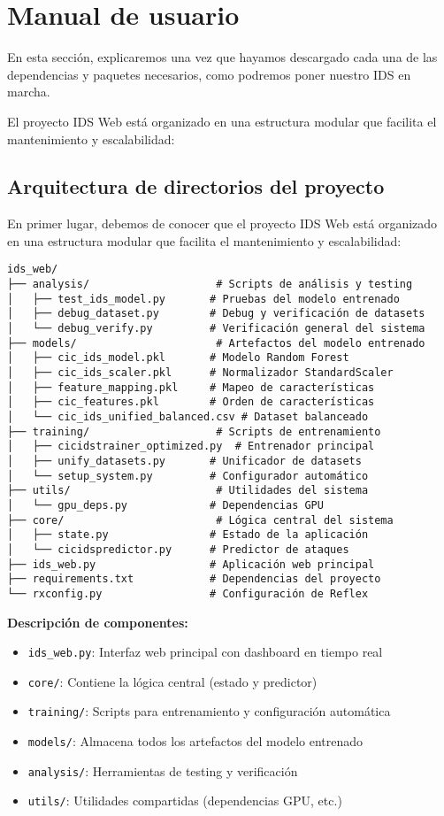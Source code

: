 \section{Manual de usuario}
En esta sección, explicaremos una vez que hayamos descargado cada una de las dependencias y paquetes necesarios, como podremos poner nuestro IDS en marcha.

El proyecto IDS Web está organizado en una estructura modular que facilita el mantenimiento y escalabilidad:
\subsection{Arquitectura de directorios del proyecto}

En primer lugar, debemos de conocer que el proyecto IDS Web está organizado en una estructura modular que facilita el mantenimiento y escalabilidad:
\begin{lstlisting}[style=tfgbash,caption={Estructura de directorios del proyecto},label=List.ProjectStructure]
ids_web/
├── analysis/                    # Scripts de análisis y testing
│   ├── test_ids_model.py       # Pruebas del modelo entrenado
│   ├── debug_dataset.py        # Debug y verificación de datasets
│   └── debug_verify.py         # Verificación general del sistema
├── models/                      # Artefactos del modelo entrenado
│   ├── cic_ids_model.pkl       # Modelo Random Forest
│   ├── cic_ids_scaler.pkl      # Normalizador StandardScaler
│   ├── feature_mapping.pkl     # Mapeo de características
│   ├── cic_features.pkl        # Orden de características
│   └── cic_ids_unified_balanced.csv # Dataset balanceado
├── training/                    # Scripts de entrenamiento
│   ├── cicidstrainer_optimized.py  # Entrenador principal
│   ├── unify_datasets.py       # Unificador de datasets
│   └── setup_system.py         # Configurador automático
├── utils/                       # Utilidades del sistema
│   └── gpu_deps.py             # Dependencias GPU
├── core/                        # Lógica central del sistema
│   ├── state.py                # Estado de la aplicación
│   └── cicidspredictor.py      # Predictor de ataques
├── ids_web.py                  # Aplicación web principal
├── requirements.txt            # Dependencias del proyecto
└── rxconfig.py                 # Configuración de Reflex
\end{lstlisting}

\textbf{Descripción de componentes:}
\begin{itemize}
  \item \texttt{ids\_web.py}: Interfaz web principal con dashboard en tiempo real
  \item \texttt{core/}: Contiene la lógica central (estado y predictor)
  \item \texttt{training/}: Scripts para entrenamiento y configuración automática
  \item \texttt{models/}: Almacena todos los artefactos del modelo entrenado
  \item \texttt{analysis/}: Herramientas de testing y verificación
  \item \texttt{utils/}: Utilidades compartidas (dependencias GPU, etc.)
\end{itemize}

